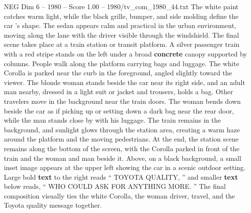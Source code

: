 \begin{textsample}{NEG Dim 6 – 1980 – Score 1.00 – 1980/tv\_com\_1980\_44.txt}
The white paint catches warm light, while the black grille, bumper, and side molding define the car ’s shape.
The sedan appears calm and practical in the urban environment, moving along the lane with the driver visible through the windshield.
The final scene takes place at a train station or transit platform.
A silver passenger train with a red stripe stands on the left under a broad \textbf{concrete} canopy supported by columns.
People walk along the platform carrying bags and luggage.
The white Corolla is parked near the curb in the foreground, angled slightly toward the viewer.
The blonde woman stands beside the car near its right side, and an adult man nearby, dressed in a light suit or jacket and trousers, holds a bag.
Other travelers move in the background near the train doors.
The woman bends down beside the car as if picking up or setting down a dark bag near the rear door, while the man stands close by with his luggage.
The train remains in the background, and sunlight glows through the station area, creating a warm haze around the platform and the moving pedestrians.
At the end, the station scene remains along the bottom of the screen, with the Corolla parked in front of the train and the woman and man beside it.
Above, on a black background, a small inset image appears at the upper left showing the car in a scenic outdoor setting.
Large bold \textbf{text} to the right reads “ TOYOTA QUALITY, ” and smaller \textbf{text} below reads, “ WHO COULD ASK FOR ANYTHING MORE. ” The final composition visually ties the white Corolla, the woman driver, travel, and the Toyota quality message together.

\end{textsample}

